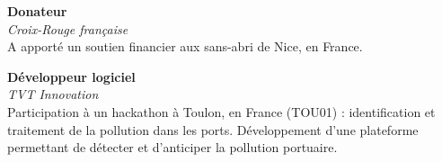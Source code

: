 \textbf{Donateur}  \\
\textit{Croix-Rouge française} \\
\small
A apporté un soutien financier aux sans-abri de Nice, en France.
\vspace{1ex}

\textbf{Développeur logiciel}  \\
\textit{TVT Innovation} \\
\small
Participation à un hackathon à Toulon, en France (TOU01) : identification et traitement de la pollution dans les ports. Développement d'une plateforme permettant de détecter et d'anticiper la pollution portuaire.
